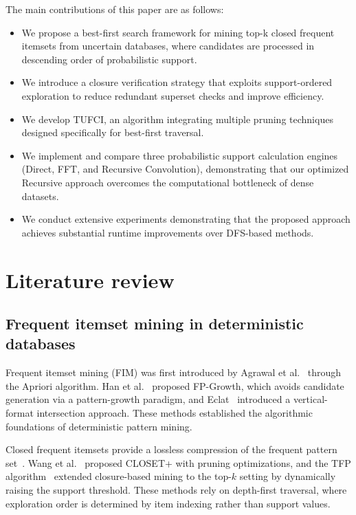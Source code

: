 \documentclass[10pt,letterpaper]{article}
\begin{document}
The main contributions of this paper are as follows:
\begin{itemize}
    \item We propose a best-first search framework for mining top-k closed
    frequent itemsets from uncertain databases, where candidates are processed
    in descending order of probabilistic support.

    \item We introduce a closure verification strategy that exploits
    support-ordered exploration to reduce redundant superset checks and improve
    efficiency.

    \item We develop TUFCI, an algorithm integrating multiple pruning
    techniques designed specifically for best-first traversal.

    \item We implement and compare three probabilistic support calculation
    engines (Direct, FFT, and Recursive Convolution), demonstrating that our
    optimized Recursive approach overcomes the computational bottleneck of
    dense datasets.

    \item We conduct extensive experiments demonstrating that the proposed
    approach achieves substantial runtime improvements over DFS-based methods.
\end{itemize}





\section*{Literature review}


\subsection*{Frequent itemset mining in deterministic databases}

Frequent itemset mining (FIM) was first introduced by Agrawal et al.~\cite{bib1}
through the Apriori algorithm. Han et al.~\cite{bib8} proposed FP-Growth, which
avoids candidate generation via a pattern-growth paradigm, and Eclat~\cite{bib10}
introduced a vertical-format intersection approach. These methods established the
algorithmic foundations of deterministic pattern mining.

Closed frequent itemsets provide a lossless compression of the frequent pattern
set~\cite{bib5}. Wang et al.~\cite{bib11} proposed CLOSET+ with pruning
optimizations, and the TFP algorithm~\cite{bib6} extended closure-based mining to
the top-$k$ setting by dynamically raising the support threshold. These methods
rely on depth-first traversal, where exploration order is determined by item
indexing rather than support values.
\end{document}
